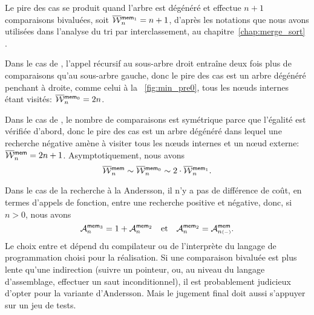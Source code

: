 Le pire des cas se produit quand l'arbre est dégénéré et  effectue \(n+1\)
comparaisons bivaluées, soit \(\OW{\fun{mem}_1}{n} = n +
1\), d'après les notations que nous
avons utilisées dans l'analyse du tri par interclassement, au chapitre~\ref{chap:merge_sort}
.

Dans le cas de , l'appel récursif au sous-arbre droit
entraîne deux fois plus de comparaisons qu'au sous-arbre gauche, donc
le pire des cas est un arbre dégénéré penchant à droite, comme celui à
la \fig~\vref{fig:min_pre0}, tous les nœuds internes étant
visités: \(\OW{\fun{mem}_0}{n} = 2n\).

Dans le cas de , le nombre de comparaisons est symétrique
parce que l'égalité est vérifiée d'abord, donc le pire des cas est un
arbre dégénéré dans lequel une recherche négative amène à visiter tous
les nœuds internes et un nœud externe: \(\OW{\fun{mem}}{n} =
2n + 1\). Asymptotiquement, nous avons
\begin{equation*}
\OW{\fun{mem}}{n} \sim \OW{\fun{mem}_0}{n}
\sim 2 \cdot \OW{\fun{mem}_1}{n}.
\end{equation*}

Dans le cas de la recherche à la Andersson, il n'y a pas de différence
de coût, en termes d'appels de fonction, entre une recherche positive
et négative, donc, si \(n > 0\), nous avons
\begin{equation}
\M{\fun{mem}_3}{n} = 1 + \M{\fun{mem}_2}{n}\quad\text{et}\quad
\M{\fun{mem}_2}{n} = \M{\fun{mem}}{n{\scriptscriptstyle (-)}}.
\label{eq:Andersson_average}
\index{mem3@$\M{\fun{mem}_3}{n}$}\index{mem2@$\M{\fun{mem}_2}{n}$}
\end{equation}
Le choix entre  et  dépend du
compilateur ou de l'interprète du langage de programmation choisi pour
la réalisation. Si une comparaison bivaluée est plus lente qu'une
indirection (suivre un pointeur, ou, au niveau du langage
d'assemblage, effectuer un saut inconditionnel), il est probablement
judicieux d'opter pour la variante d'Andersson. Mais le jugement final
doit aussi s'appuyer sur un jeu de tests.

